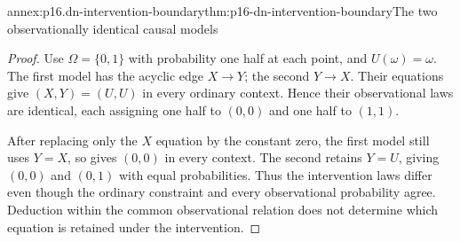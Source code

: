 \begin{annexitem}{annex:p16.dn-intervention-boundary}{thm:p16-dn-intervention-boundary}{The two observationally identical causal models}
\begin{proof}
Use \(\Omega=\{0,1\}\)
with probability one
half at each point,
and \(U(\omega)=\omega\).
The first model has
the acyclic edge
\(X\to Y\); the
second \(Y\to X\).
Their equations give
\((X,Y)=(U,U)\)
in every ordinary
context. Hence their
observational laws
are identical, each
assigning one half
to \((0,0)\) and
one half to \((1,1)\).

After replacing only
the \(X\) equation
by the constant zero,
the first model
still uses \(Y=X\),
so gives \((0,0)\)
in every context.
The second retains
\(Y=U\), giving
\((0,0)\) and
\((0,1)\) with equal
probabilities.
Thus the intervention
laws differ even
though the ordinary
constraint and every
observational probability
agree. Deduction
within the common
observational relation
does not determine
which equation is
retained under the
intervention.
\end{proof}
\end{annexitem}
